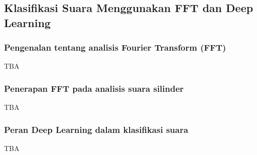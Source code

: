 \subsection{Klasifikasi Suara Menggunakan FFT dan Deep Learning}
\subsubsection{Pengenalan tentang analisis Fourier Transform (FFT)}

TBA

\subsubsection{Penerapan FFT pada analisis suara silinder}

TBA

\subsubsection{Peran Deep Learning dalam klasifikasi suara}

TBA

\newpage